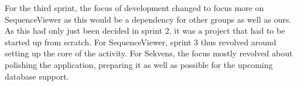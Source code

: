 For the third sprint, the focus of development changed to focus more on SequenceViewer as this would be a dependency for other groups as well as ours. As this had only just been decided in sprint 2, it was a project that had to be started up from scratch. For SequenceViewer, sprint 3 thus revolved around setting up the core of the activity. For Sekvens, the focus mostly revolved about polishing the application, preparing it as well as possible for the upcoming database support.